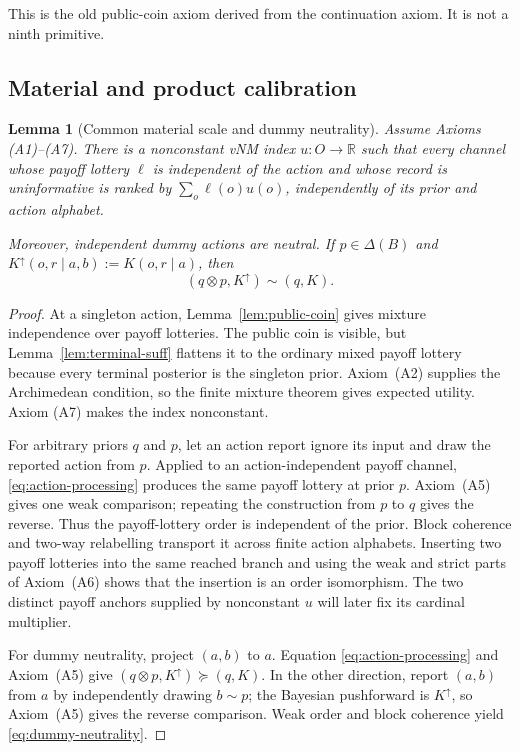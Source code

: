 \documentclass[11pt,a4paper]{article}
\newtheorem{lemma}[theorem]{Lemma}
\theoremstyle{definition}
\newcommand{\D}{\Delta}
\newcommand{\1}{\mathbf 1}
\begin{document}
This is the old public-coin axiom derived from the continuation axiom.  It is not a ninth primitive.

\subsection{Material and product calibration}

\begin{lemma}[Common material scale and dummy neutrality]\label{lem:payoff-scale}
Assume Axioms \textup{(A1)--(A7)}.  There is a nonconstant vNM index $u:O\to\mathbb R$ such that every channel whose
payoff lottery $\ell$ is independent of the action and whose record is uninformative is ranked by
$\sum_o\ell(o)u(o)$, independently of its prior and action alphabet.

Moreover, independent dummy actions are neutral.  If $p\in\D(B)$ and
$K^\uparrow(o,r\mid a,b):=K(o,r\mid a)$, then
\begin{equation}
 (q\otimes p,K^\uparrow)\sim(q,K).
 \label{eq:dummy-neutrality}
\end{equation}
\end{lemma}

\begin{proof}
At a singleton action, Lemma~\ref{lem:public-coin} gives mixture independence over payoff lotteries.  The public coin
is visible, but Lemma~\ref{lem:terminal-suff} flattens it to the ordinary mixed payoff lottery because every terminal
posterior is the singleton prior.  Axiom~\textup{(A2)} supplies the Archimedean condition, so the finite mixture theorem gives expected utility.  Axiom
\textup{(A7)} makes the index nonconstant.

For arbitrary priors $q$ and $p$, let an action report ignore its input and draw the reported action from $p$.  Applied
to an action-independent payoff channel, \eqref{eq:action-processing} produces the same payoff lottery at prior $p$.
Axiom~\textup{(A5)} gives one weak comparison; repeating the construction from $p$ to $q$ gives the reverse.  Thus the
payoff-lottery order is independent of the prior.  Block coherence and two-way relabelling transport it across finite
action alphabets.  Inserting two payoff lotteries into the same reached branch and using the weak and strict parts of
Axiom~\textup{(A6)} shows that the insertion is an order isomorphism.  The two distinct payoff anchors supplied by
nonconstant $u$ will later fix its cardinal multiplier.

For dummy neutrality, project $(a,b)$ to $a$.  Equation \eqref{eq:action-processing} and Axiom~\textup{(A5)} give
$(q\otimes p,K^\uparrow)\succeq(q,K)$.  In the other direction, report $(a,b)$ from $a$ by independently drawing
$b\sim p$; the Bayesian pushforward is $K^\uparrow$, so Axiom~\textup{(A5)} gives the reverse comparison.  Weak order
and block coherence yield \eqref{eq:dummy-neutrality}.
\end{proof}
\end{document}
